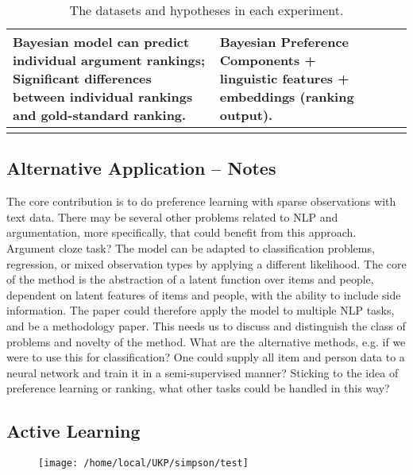 \begin{table*}
\begin{tabularx}{\textwidth}{ l  X  X  X }
  Bayesian model can predict individual argument rankings;\newline
  Significant differences between individual rankings and gold-standard ranking. &
  Bayesian Preference Components + linguistic features + embeddings (ranking output). \\\hline\\ 
  \end{tabularx}
  \caption{\label{tab:expt_data} The datasets and hypotheses in each experiment.}
\end{table*}

\subsection{Alternative Application -- Notes}

The core contribution is to do preference learning with sparse observations with text data. 
There may be several other problems related to NLP and argumentation, more specifically, that
could benefit from this approach. 
Argument cloze task? 
The model can be adapted to classification problems, regression, or mixed observation types by applying a different likelihood. The core of the method is the abstraction of a latent function over items and people, dependent on latent features of items and people, with the ability to include side information.
The paper could therefore apply the model to multiple NLP tasks, and be a methodology paper. 
This needs us to discuss and distinguish the class of problems and novelty of the method. 
What are the alternative methods, e.g. if we were to use this for classification? One could supply all 
item and person data to a neural network and train it in a semi-supervised manner?
Sticking to the idea of preference learning or ranking, what other tasks could be handled in this way?


\subsection{Active Learning}

\begin{figure}
\texttt{[image: /home/local/UKP/simpson/test]}
\end{figure}
